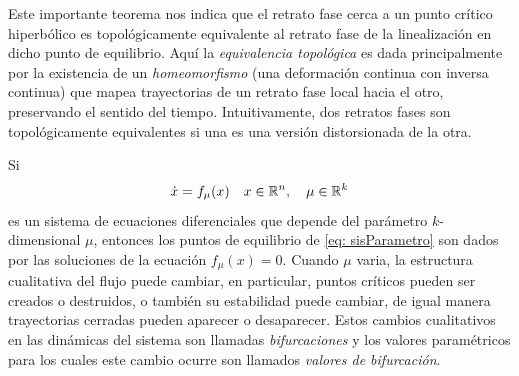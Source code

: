 Este importante teorema nos indica que el retrato fase cerca a un punto crítico hiperbólico es topológicamente equivalente al retrato fase de la linealización en dicho punto de equilibrio. Aquí la \textit{equivalencia topológica} es dada principalmente por la existencia de un \textit{homeomorfismo} (una deformación continua con inversa continua) que mapea trayectorias de un retrato fase local hacia el otro, preservando el sentido del tiempo. Intuitivamente, dos retratos fases son topológicamente equivalentes si una es una versión distorsionada de la otra.

Si
\begin{equation}
	\dot{x} = f_{\mu}(x) \quad x \in {\mathbb{R}}^{n}, \quad \mu \in {\mathbb{R}}^{k}
	\label{eq: sisParametro}
\end{equation}
es un sistema de ecuaciones diferenciales que depende del parámetro $k$-dimensional $\mu$, entonces los puntos de equilibrio de \eqref{eq: sisParametro} son dados por las soluciones de la ecuación $f_{\mu}(x) = 0$. Cuando $\mu$ varia, la estructura cualitativa del flujo puede cambiar, en particular, puntos críticos pueden ser creados o destruidos, o también su estabilidad puede cambiar, de igual manera trayectorias cerradas pueden aparecer o desaparecer. Estos cambios cualitativos en las dinámicas del sistema son llamadas \textit{bifurcaciones} y los valores paramétricos para los cuales este cambio ocurre son llamados \textit{valores de bifurcación}.